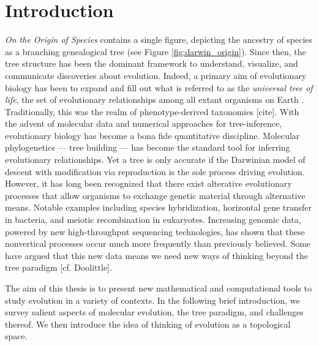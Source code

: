 \chapter{Introduction}
\label{ch:introduction}


\emph{On the Origin of Species} contains a single figure, depicting the ancestry of species as a branching genealogical tree \cite{Darwin:1859uh} (see Figure \ref{fig:darwin_origin}).
Since then, the tree structure has been the dominant framework to understand, visualize, and communicate discoveries about evolution.
Indeed, a primary aim of evolutionary biology has been to expand and fill out what is referred to as the \emph{universal tree of life}, the set of evolutionary relationships among all extant organisms on Earth \cite{Bowler:2003uz}.
Traditionally, this was the realm of phenotype-derived taxonomies [cite].
With the advent of molecular data and numerical approaches for tree-inference, evolutionary biology has become a bona fide quantitative discipline.
Molecular phylogenetics --- tree building --- has become the standard tool for inferring evolutionary relationships.
Yet a tree is only accurate if the Darwinian model of descent with modification via reproduction is the sole process driving evolution.
However, it has long been recognized that there exist alterative evolutionary processes that allow organisms to exchange genetic material through alternative means.
Notable examples including species hybridization, horizontal gene transfer in bacteria, and meiotic recombination in eukaryotes.
Increasing genomic data, powered by new high-throughput sequencing technologies, has shown that these nonvertical processes occur much more frequently than previously believed.
Some have argued that this new data means we need new ways of thinking beyond the tree paradigm [cf. Doolittle].

The aim of this thesis is to present new mathematical and computational tools to study evolution in a variety of contexts.
In the following brief introduction, we survey salient aspects of molecular evolution, the tree paradigm, and challenges thereof.
We then introduce the idea of thinking of evolution as a topological space.

